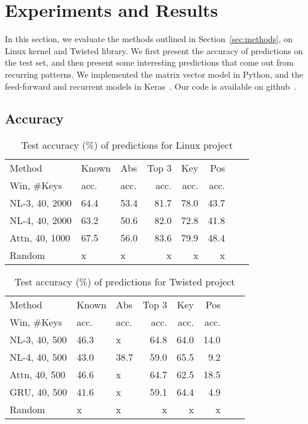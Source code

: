 \section{Experiments and Results}
\label{sec:results}

In this section, we evaluate the methods outlined in Section~\ref{sec:methods},
on Linux kernel and Twisted library. We first present the accuracy of
predictions on the test set, and then present some interesting predictions that
come out from recurring patterns. We implemented the matrix vector model in
Python, and the feed-forward and recurrent models in Keras~\cite{ref:keras}.
Our code is available on github~\cite{ref:codecompletion}.

\subsection{Accuracy}
\label{sec:accuracy}

\begin{table}[h]
  \centering
  \small {
  \begin{tabular}{l l l r r r r r}
    \hline
    Method & Known & Abs & Top 3 & Key & Pos \\
    Win, \#Keys & acc. & acc. & acc.  & acc. & acc. \\
    \hline
    NL-3, 40, 2000 & 64.4 & 53.4 & 81.7 & 78.0 & 43.7\\
    NL-4, 40, 2000 & 63.2 & 50.6 & 82.0 & 72.8 & 41.8\\
    Attn, 40, 1000 & 67.5 & 56.0 & 83.6 & 79.9 & 48.4\\
    Random & x & x & x & x & x\\
    \hline
  \end{tabular}
  }
  \caption{Test accuracy (\%) of predictions for Linux project}
  \label{tab:linux}
\end{table}

\begin{table}[h]
  \centering
  \small {
  \begin{tabular}{l l l r r r r r}
    \hline
    Method & Known & Abs & Top 3 & Key & Pos \\
    Win, \#Keys & acc. & acc. & acc.  & acc. & acc. \\
    \hline
    NL-3, 40, 500 & 46.3 & x & 64.8 & 64.0 & 14.0\\
    NL-4, 40, 500 & 43.0 & 38.7 & 59.0 & 65.5 & 9.2\\
    Attn, 40, 500 & 46.6 & x & 64.7 & 62.5 & 18.5\\
    GRU, 40, 500 & 41.6 & x & 59.1 & 64.4 & 4.9\\
    Random & x & x & x & x & x\\
    \hline
  \end{tabular}
  }
  \caption{Test accuracy (\%) of predictions for Twisted project}
  \label{tab:twisted}
\end{table}

